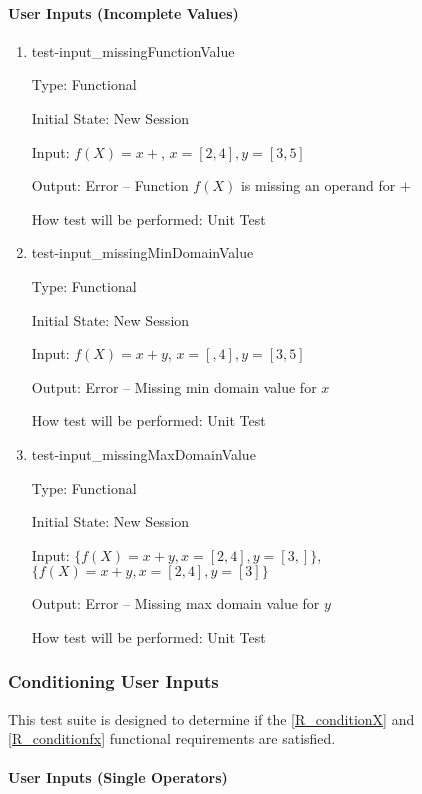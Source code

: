 \documentclass[12pt, titlepage]{article}
\begin{document}
\paragraph{User Inputs (Incomplete Values)}

\begin{enumerate}
	
	\item{test-input\_missingFunctionValue}
	
	Type: Functional
	
	Initial State: New Session
	
	Input: $f(X) = x +$, $x = [2,4], y = [3,5]$
	
	Output: Error -- Function $f(X)$ is missing an operand for $+$
	
	How test will be performed: Unit Test\\
	
	\item{test-input\_missingMinDomainValue}
	
	Type: Functional
	
	Initial State: New Session
	
	Input: $f(X) = x + y$, $x = [,4], y = [3,5]$
	
	Output: Error -- Missing min domain value for $x$
	
	How test will be performed: Unit Test\\
	
	\item{test-input\_missingMaxDomainValue}
	
	Type: Functional
	
	Initial State: New Session
	
	Input: $\{f(X) = x + y, x = [2,4], y = [3,]\}$, $\{f(X) = x + y, x = 
	[2,4], y = [3]\}$
	
	Output: Error -- Missing max domain value for $y$
	
	How test will be performed: Unit Test
	
\end{enumerate}

\subsubsection{Conditioning User Inputs}
This test suite is designed to determine if the \ref{R_conditionX} and 
\ref{R_conditionfx} functional requirements are satisfied.

\paragraph{User Inputs (Single Operators)}
\end{document}
